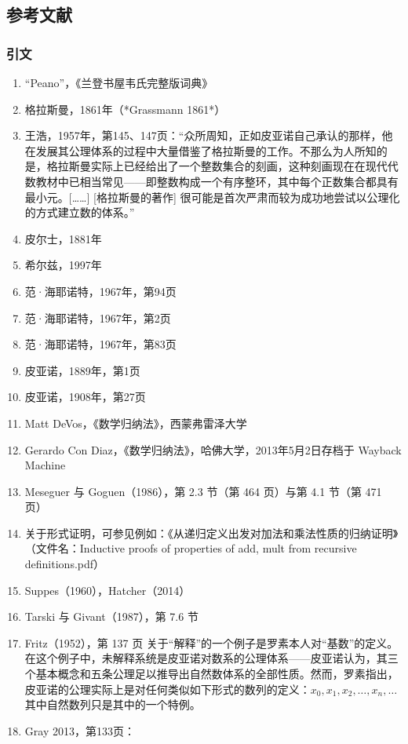 \subsection{参考文献}
\subsubsection{引文}
\begin{enumerate}
\item “Peano”，《兰登书屋韦氏完整版词典》
\item 格拉斯曼，1861年（*Grassmann 1861*）
\item 王浩，1957年，第145、147页：“众所周知，正如皮亚诺自己承认的那样，他在发展其公理体系的过程中大量借鉴了格拉斯曼的工作。不那么为人所知的是，格拉斯曼实际上已经给出了一个整数集合的刻画，这种刻画现在在现代代数教材中已相当常见——即整数构成一个有序整环，其中每个正数集合都具有最小元。[……] [格拉斯曼的著作] 很可能是首次严肃而较为成功地尝试以公理化的方式建立数的体系。”
\item 皮尔士，1881年
\item 希尔兹，1997年
\item 范·海耶诺特，1967年，第94页
\item 范·海耶诺特，1967年，第2页
\item 范·海耶诺特，1967年，第83页
\item 皮亚诺，1889年，第1页
\item 皮亚诺，1908年，第27页
\item Matt DeVos，《数学归纳法》，西蒙弗雷泽大学
\item Gerardo Con Diaz，《数学归纳法》，哈佛大学，2013年5月2日存档于 Wayback Machine
\item Meseguer 与 Goguen（1986），第 2.3 节（第 464 页）与第 4.1 节（第 471 页）
\item 关于形式证明，可参见例如：《从递归定义出发对加法和乘法性质的归纳证明》（文件名：Inductive proofs of properties of add, mult from recursive definitions.pdf）
\item Suppes（1960），Hatcher（2014）
\item Tarski 与 Givant（1987），第 7.6 节
\item Fritz（1952），第 137 页
关于“解释”的一个例子是罗素本人对“基数”的定义。在这个例子中，未解释系统是皮亚诺对数系的公理体系——皮亚诺认为，其三个基本概念和五条公理足以推导出自然数体系的全部性质。然而，罗素指出，皮亚诺的公理实际上是对任何类似如下形式的数列的定义：$x_0, x_1, x_2, \ldots, x_n, \ldots$其中自然数列只是其中的一个特例。
\item Gray 2013，第133页：

\end{enumerate}
